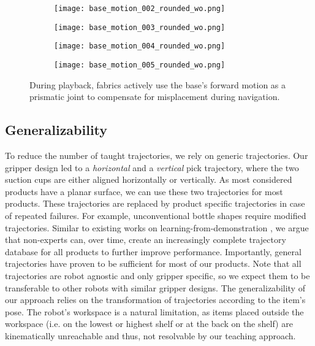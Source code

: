 \begin{figure*}[t]
  \centering
  \begin{subfigure}[b]{0.20\linewidth}
    \centering
    \texttt{[image: base\_motion\_002\_rounded\_wo.png]}
    \caption{}
    \label{subfig:base_motion_1}
  \end{subfigure}
  \begin{subfigure}[b]{0.20\linewidth}
    \centering
    \texttt{[image: base\_motion\_003\_rounded\_wo.png]}
    \caption{}
    \label{subfig:base_motion_2}
  \end{subfigure}
  \begin{subfigure}[b]{0.20\linewidth}
    \centering
    \texttt{[image: base\_motion\_004\_rounded\_wo.png]}
    \caption{}
    \label{subfig:base_motion_3}
  \end{subfigure}
  \begin{subfigure}[b]{0.20\linewidth}
    \centering
    \texttt{[image: base\_motion\_005\_rounded\_wo.png]}
    \caption{}
    \label{subfig:base_motion_4}
  \end{subfigure}
  \caption{During playback, \ac{fabrics}  actively use the base's forward motion as a prismatic joint to compensate for misplacement during navigation.}
  \label{fig:base_motion}
\end{figure*}
%
\subsection{Generalizability}
\label{sub:generalizability}

To reduce the number of taught trajectories, we rely
on generic trajectories. Our gripper design led to 
a \textit{horizontal} and a \textit{vertical} pick
trajectory, where the two suction cups are either aligned
horizontally or vertically. As most considered products have a planar surface, we can use these two
trajectories for most products. These trajectories are
replaced by product specific trajectories in case of
repeated failures. For example, unconventional bottle
shapes require modified trajectories. Similar to existing
works on learning-from-demonstration \cite{argall2009survey}, we
argue that non-experts can, over time, create an increasingly
complete trajectory database for all products to further
improve performance. Importantly, general trajectories have
proven to be sufficient for most of our products.
Note that all trajectories are robot agnostic and only
gripper specific, so we expect them to be transferable to
other robots with similar gripper designs.
The generalizability of our approach relies on the
transformation of trajectories according to the item's pose. The robot's workspace is a natural limitation, as items placed outside the workspace
(i.e. on the lowest or highest shelf or at the back on the
shelf) are kinematically unreachable and thus, not resolvable by our teaching approach.



